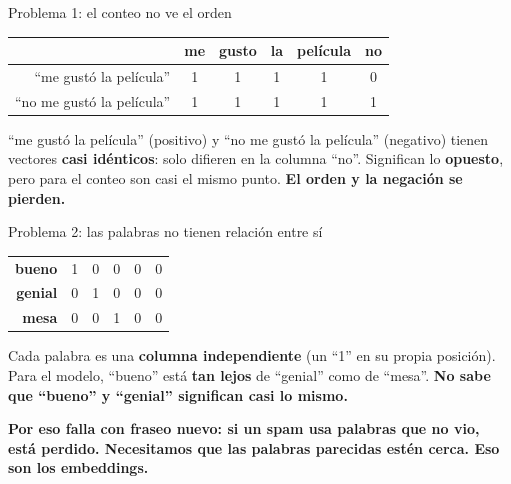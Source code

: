 \documentclass[aspectratio=169, 11pt]{beamer}
\begin{document}
\begin{frame}[shrink]{Problema 1: el conteo no ve el orden}
  \vspace{2pt}
  \begin{center}
  {\footnotesize\renewcommand{\arraystretch}{1.3}
  \begin{tabular}{r|ccccc}
     & \cellcolor{arcaGray}me & \cellcolor{arcaGray}gusto & \cellcolor{arcaGray}la & \cellcolor{arcaGray}película & \cellcolor{arcaGray}\textbf{no} \\\hline
    \cellcolor{codeGreen!15}``me gustó la película'' & 1 & 1 & 1 & 1 & 0 \\
    \cellcolor{arcaRed!12}``no me gustó la película'' & 1 & 1 & 1 & 1 & \cellcolor{codeOrange!35}1 \\
  \end{tabular}}
  \end{center}
  \vspace{4pt}
  {\footnotesize\color{arcaDark}
  ``me gustó la película'' (positivo) y ``no me gustó la película'' (negativo) tienen vectores
  \textbf{casi idénticos}: solo difieren en la columna ``no''. Significan lo \textbf{opuesto}, pero
  para el conteo son casi el mismo punto. \textbf{El orden y la negación se pierden.}}
\end{frame}

\begin{frame}[shrink]{Problema 2: las palabras no tienen relación entre sí}
  \vspace{2pt}
  \begin{center}
  {\footnotesize\renewcommand{\arraystretch}{1.3}
  \begin{tabular}{r|ccccc}
    \cellcolor{arcaGray}\textbf{bueno}  & \cellcolor{codeGreen!30}1 & 0 & 0 & 0 & 0 \\
    \cellcolor{arcaGray}\textbf{genial} & 0 & \cellcolor{codeGreen!30}1 & 0 & 0 & 0 \\
    \cellcolor{arcaGray}\textbf{mesa}   & 0 & 0 & \cellcolor{codeBlue!30}1 & 0 & 0 \\
  \end{tabular}}
  \end{center}
  \vspace{4pt}
  {\footnotesize\color{arcaDark}
  Cada palabra es una \textbf{columna independiente} (un ``1'' en su propia posición). Para el modelo,
  ``bueno'' está \textbf{tan lejos} de ``genial'' como de ``mesa''. \textbf{No sabe que ``bueno'' y
  ``genial'' significan casi lo mismo.}}
  \vspace{4pt}
  \begin{tcolorbox}[colback=arcaRed!8, colframe=arcaRed, leftrule=3pt, boxrule=0pt, sharp corners, left=8pt, right=8pt, top=4pt, bottom=4pt]
    {\footnotesize\color{arcaDark}\bfseries
    Por eso falla con \textbf{fraseo nuevo}: si un spam usa palabras que no vio, está perdido. Necesitamos
    que las palabras \textbf{parecidas} estén \textbf{cerca}. Eso son los embeddings.}
  \end{tcolorbox}
\end{frame}
\end{document}
